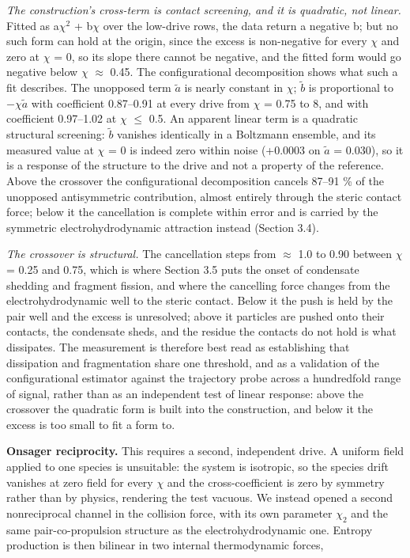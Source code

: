\documentclass[aps,pre,preprint,superscriptaddress,nofootinbib,longbibliography]{revtex4-2}
\begin{document}
\emph{The construction's cross-term is contact screening, and it is quadratic, not linear.} Fitted as a$\chi ^{2}$ + b$\chi$ over the low-drive rows, the data return a negative b; but no such form can hold at the origin, since the excess is non-negative for every $\chi$ and zero at $\chi$ = 0, so its slope there cannot be negative, and the fitted form would go negative below $\chi$ $\approx$ 0.45. The configurational decomposition shows what such a fit describes. The unopposed term $\tilde a$ is nearly constant in $\chi$; $\tilde b$ is proportional to $-\chi\tilde a$ with coefficient 0.87--0.91 at every drive from $\chi$ = 0.75 to 8, and with coefficient 0.97--1.02 at $\chi$ $\le$ 0.5. An apparent linear term is a quadratic structural screening: $\tilde b$ vanishes identically in a Boltzmann ensemble, and its measured value at $\chi$ = 0 is indeed zero within noise (+0.0003 on $\tilde a$ = 0.030), so it is a response of the structure to the drive and not a property of the reference. Above the crossover the configurational decomposition cancels 87--91 \% of the unopposed antisymmetric contribution, almost entirely through the steric contact force; below it the cancellation is complete within error and is carried by the symmetric electrohydrodynamic attraction instead (Section 3.4).

\emph{The crossover is structural.} The cancellation steps from $\approx$ 1.0 to 0.90 between $\chi$ = 0.25 and 0.75, which is where Section 3.5 puts the onset of condensate shedding and fragment fission, and where the cancelling force changes from the electrohydrodynamic well to the steric contact. Below it the push is held by the pair well and the excess is unresolved; above it particles are pushed onto their contacts, the condensate sheds, and the residue the contacts do not hold is what dissipates. The measurement is therefore best read as establishing that dissipation and fragmentation share one threshold, and as a validation of the configurational estimator against the trajectory probe across a hundredfold range of signal, rather than as an independent test of linear response: above the crossover the quadratic form is built into the construction, and below it the excess is too small to fit a form to.

\textbf{Onsager reciprocity.} This requires a second, independent drive. A uniform field applied to one species is unsuitable: the system is isotropic, so the species drift vanishes at zero field for every $\chi$ and the cross-coefficient is zero by symmetry rather than by physics, rendering the test vacuous. We instead opened a second nonreciprocal channel in the collision force, with its own parameter $\chi _{2}$ and the same pair-co-propulsion structure as the electrohydrodynamic one. Entropy production is then bilinear in two internal thermodynamic forces,
\end{document}
